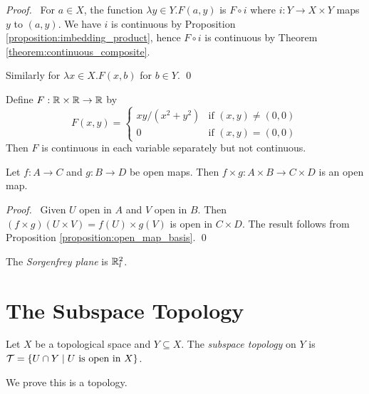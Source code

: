 \begin{proof}
    \pf\ For $a \in X$, the function $\lambda y \in Y. F(a,y)$ is $F \circ i$ where $i : Y \rightarrow X \times Y$ maps $y$ to $(a,y)$.
    We have $i$ is continuous by Proposition \ref{proposition:imbedding_product}, hence $F \circ i$ is continuous by Theorem \ref{theorem:continuous_composite}.

    Similarly for $\lambda x \in X. F(x,b)$ for $b \in Y$. \qed
\end{proof}

\begin{example}
    Define $F : \mathbb{R} \times \mathbb{R} \rightarrow \mathbb{R}$ by
    \[ F(x,y) = \begin{cases}
        xy / (x^2 + y^2) & \text{if } (x,y) \neq (0,0) \\
        0 & \text{if } (x,y) = (0,0)
    \end{cases} \]
    Then $F$ is continuous in each variable separately but not continuous.
\end{example}

\begin{proposition}
    \label{proposition:open_map_product}
    Let $f : A \rightarrow C$ and $g : B \rightarrow D$ be open maps. Then $f \times g : A \times B \rightarrow C \times D$ is an open map.
\end{proposition}

\begin{proof}
    \pf\ Given $U$ open in $A$ and $V$ open in $B$. Then $(f \times g)(U \times V) = f(U) \times g(V)$ is open in $C \times D$.
    The result follows from Proposition \ref{proposition:open_map_basis}. \qed
\end{proof}

\begin{definition}
    The \emph{Sorgenfrey plane} is $\mathbb{R}_l^2$.    
\end{definition}

\section{The Subspace Topology}

\begin{definition}
    Let $X$ be a topological space and $Y \subseteq X$. The \emph{subspace topology} on $Y$ is
    $\mathcal{T} = \{ U \cap Y \mid U \text{ is open in } X \}$.
\end{definition}

We prove this is a topology.

